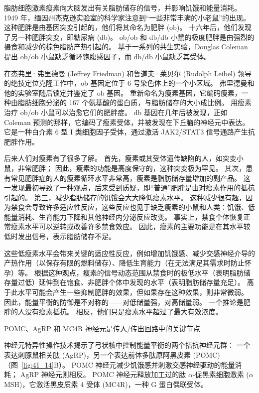 脂肪细胞激素瘦素向大脑发出有关脂肪储存的信号，并影响饥饿和能量消耗。
1949 年，缅因州杰克逊实验室的科学家注意到“一些非常丰满的小老鼠”的出现。
这种肥胖是由基因突变引起的，他们将其命名为肥胖 (ob)。
十六年后，他们发现了另一种肥胖突变，即糖尿病 (db)。
ob/ob 和 db/db 小鼠的极度肥胖是由强烈的摄食和减少的棕色脂肪产热引起的。
基于一系列的共生实验，Douglas Coleman 提出 ob/ob 小鼠缺乏循环饱腹感因子，而 db/db 小鼠缺乏其受体。


在杰弗里·弗里德曼 (Jeffrey Friedman) 和鲁道夫·莱贝尔 (Rudolph Leibel) 领导的绝技定位克隆工作中，ob 基因定位于 6 号染色体上的一个小区域。
弗里德曼和他的实验室随后锁定并鉴定了 ob 基因。
重新命名为瘦素基因，它编码瘦素，一种由脂肪细胞分泌的 167 个氨基酸的蛋白质，与脂肪储存的大小成比例。
用瘦素治疗 ob/ob 小鼠可以治愈它们的肥胖症。
db 基因在几年后被发现，正如 Coleman 预测的那样，它编码了瘦素受体，并被发现在下丘脑的神经元中表达。
它是一种白介素 6 型 I 类细胞因子受体，通过激活 JAK2/STAT3 信号通路产生抗肥胖作用。


后来人们对瘦素有了很多了解。
首先，瘦素或其受体遗传缺陷的人，如突变小鼠，非常肥胖；
因此，瘦素的功能是高度保守的，这种突变极为罕见。
其次，患有常见肥胖症的人的瘦素循环水平非常高，瘦素是脂肪储存量增加的副产品。
这一发现最初导致了一种观点，后来受到质疑，即“普通”肥胖是由对瘦素作用的抵抗引起的。
第三，减少脂肪储存的饥饿会大大降低瘦素水平。
这种减少很有趣，因为禁食会导致许多适应性反应，这些反应也见于缺乏瘦素的小鼠和人类：饥饿、低能量消耗、生育能力下降和其他神经内分泌反应改变。
事实上，禁食个体恢复正常瘦素水平可以逆转或改善许多禁食效应。
因此，瘦素的主要功能是在其水平较低时发出信号，表示脂肪储存不足。


这些低瘦素水平会带来关键的适应性反应，例如增加饥饿感、减少交感神经介导的产热作用（以保存有限的燃料储存）、降低生育能力（在无法满足其需求时防止怀孕）等。
根据这种观点，瘦素的信号动态范围从禁食时的极低水平（表明脂肪储存量过低）延伸到在饱食、非肥胖个体中发现的水平（表明脂肪储存量充足）。
高于此水平可能会产生一些抑制肥胖的效果，但如果存在这种效果，则非常微弱。
因此，能量平衡的防御是不对称的——对低储量强，对高储量弱。
一个推论是肥胖的人没有瘦素抵抗。
相反，他们只是瘦素水平超过了最大有效浓度。


POMC、AgRP 和 MC4R 神经元是传入/传出回路中的关键节点

神经元特异性操作技术揭示了弓状核中控制能量平衡的两个拮抗神经元群：
一个表达刺豚鼠相关肽 (AgRP)，另一个表达前体多肽原阿黑皮素 (POMC)（图~\ref{fig:41_14}B）。
POMC 神经元减少饥饿感并刺激交感神经驱动的能量消耗；
AgRP 神经元则相反。
POMC 神经元释放加工过的肽 $\alpha$-促黑素细胞激素 ($\alpha$MSH)，它激活黑皮质素 4 受体 (MC4R)，一种 G 蛋白偶联受体。


